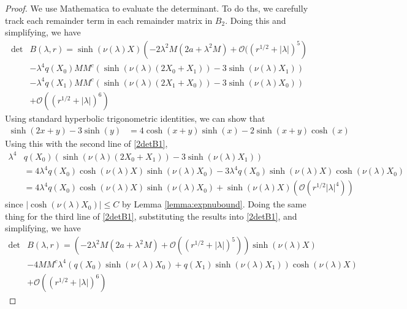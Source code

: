 \documentclass[thesis.tex]{subfiles}
\begin{document}
\begin{lemma}
\begin{proof}
We use Mathematica to evaluate the determinant. To do ths, we carefully track each remainder term in each remainder matrix in $B_2$. Doing this and simplifying, we have
\begin{equation}\label{2detB1}
\begin{aligned}
\det &B(\lambda, r) = \sinh(\nu(\lambda)X)\left(-2 \lambda^2 M (2a + \lambda^2 M) +  \mathcal{O}( (r^{1/2} + |\lambda|)^5 \right) \\
&-\lambda^4 q(X_0) M M^c \left( \sinh(\nu(\lambda)(2 X_0 + X_1)) - 3 \sinh(\nu(\lambda)X_1)  \right) \\
&-\lambda^4 q(X_1) M M^c \left( \sinh(\nu(\lambda)(2 X_1 + X_0)) - 3 \sinh(\nu(\lambda)X_0)  \right) \\
&+ \mathcal{O}( (r^{1/2} + |\lambda|)^6) 
\end{aligned}
\end{equation}
Using standard hyperbolic trigonometric identities, we can show that 
\begin{align*}
\sinh(2 x + y) - 3 \sinh(y) &= 4 \cosh(x + y)\sinh(x) 
-2 \sinh(x+y)\cosh(x) 
\end{align*}
Using this with the second line of \cref{2detB1}, 
\begin{align*}
\lambda^4 &q(X_0) \left( \sinh(\nu(\lambda)(2 X_0 + X_1)) - 3 \sinh(\nu(\lambda)X_1)  \right) \\
&= 4 \lambda^4 q(X_0) \cosh(\nu(\lambda)X)\sinh(\nu(\lambda)X_0) - 3 \lambda^4 q(X_0) \sinh(\nu(\lambda)X)\cosh(\nu(\lambda)X_0) \\
&= 4 \lambda^4 q(X_0) \cosh(\nu(\lambda)X)\sinh(\nu(\lambda)X_0) + \sinh(\nu(\lambda)X)(\mathcal{O}(r^{1/2}|\lambda|^4))
\end{align*}
since $|\cosh(\nu(\lambda)X_0)|\leq C$ by Lemma \ref{lemma:expnubound}. Doing the same thing for the third line of \cref{2detB1}, substituting the results into \cref{2detB1}, and simplifying, we have
\begin{equation*}
\begin{aligned}
\det &B(\lambda, r) = \left(-2 \lambda^2 M (2a + \lambda^2 M) + \mathcal{O}( (r^{1/2} + |\lambda|)^5) \right) \sinh(\nu(\lambda)X) \\
&-4 M M^c \lambda^4 ( q(X_0) \sinh(\nu(\lambda)X_0) + q(X_1) \sinh(\nu(\lambda)X_1) ) \cosh(\nu(\lambda)X)  \\
&+ \mathcal{O}( (r^{1/2} + |\lambda|)^6 ) 
\end{aligned}
\end{equation*}
\end{proof}
\end{lemma}
\end{document}
